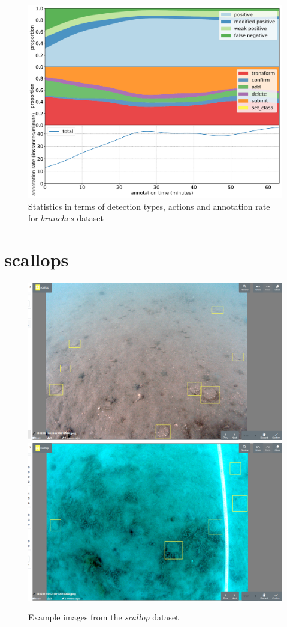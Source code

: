 \begin{figure}[!h]
\centering
\includegraphics[width=1.0\linewidth]{charts/action_annotations/branches.pdf}
\caption{Statistics in terms of detection types, actions and annotation rate for $branches$ dataset}
\label{fig:branches_annotation}
\end{figure}

\pagebreak
\section {scallops}
\label{sec:scallop_details}


\begin{figure}[!h]
  \includegraphics[width=0.475\linewidth]{figures/annotation/screenshots/scallops.png}
  \hfill
  \includegraphics[width=0.475\linewidth]{figures/annotation/screenshots/scallops3.png}
\caption{Example images from the \emph{scallop} dataset}
\label{fig:scallop_dataset}  
\end{figure}

